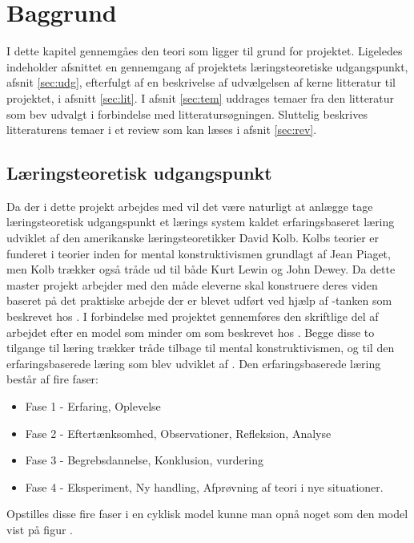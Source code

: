 \chapter{Baggrund}
\label{Ch:2}

I dette kapitel gennemgåes den teori som ligger til grund for projektet. Ligeledes indeholder afsnittet en gennemgang af projektets læringsteoretiske udgangspunkt, afsnit \vref{sec:udg}, efterfulgt af en beskrivelse af udvælgelsen af kerne litteratur til projektet, i afsnitt \vref{sec:lit}. I afsnit \vref{sec:tem} uddrages temaer fra den litteratur som bev udvalgt i forbindelse med litteratursøgningen. Sluttelig beskrives litteraturens temaer i et review som kan læses i afsnit \vref{sec:rev}.


\section{Læringsteoretisk udgangspunkt}
\label{sec:udg}
Da der i dette projekt arbejdes med \ib{} vil det være naturligt at anlægge tage læringsteoretisk udgangspunkt et lærings system kaldet erfaringsbaseret læring udviklet af den amerikanske læringsteoretikker David Kolb. Kolbs teorier er funderet i teorier inden for mental konstruktivismen grundlagt af Jean Piaget, men Kolb trækker også tråde ud til både Kurt Lewin og John Dewey. Da dette master projekt arbejder med den måde eleverne skal konstruere deres viden baseret på det praktiske arbejde der er blevet udført ved hjælp af \ib-tanken som beskrevet hos \citet{Dolin2014}. I forbindelse med projektet gennemføres den skriftlige del af arbejdet efter en model som minder om \sw{} som beskrevet hos \citet{Keys1999}. Begge disse to tilgange til læring trækker tråde tilbage til mental konstruktivismen, og til den erfaringsbaserede læring som blev udviklet af \citep{Kolb1984}.
Den erfaringsbaserede læring består af fire faser:
\begin{itemize}
	\item Fase 1 - Erfaring, Oplevelse\vspace{-10pt}
	\item Fase 2 - Eftertænksomhed, Observationer, Refleksion, Analyse\vspace{-10pt}
	\item Fase 3 - Begrebsdannelse, Konklusion, vurdering\vspace{-10pt}
	\item Fase 4 - Eksperiment, Ny handling, Afprøvning af teori i nye situationer.
\end{itemize}
Opstilles disse fire faser i en cyklisk model kunne man opnå noget som den model vist på figur .
